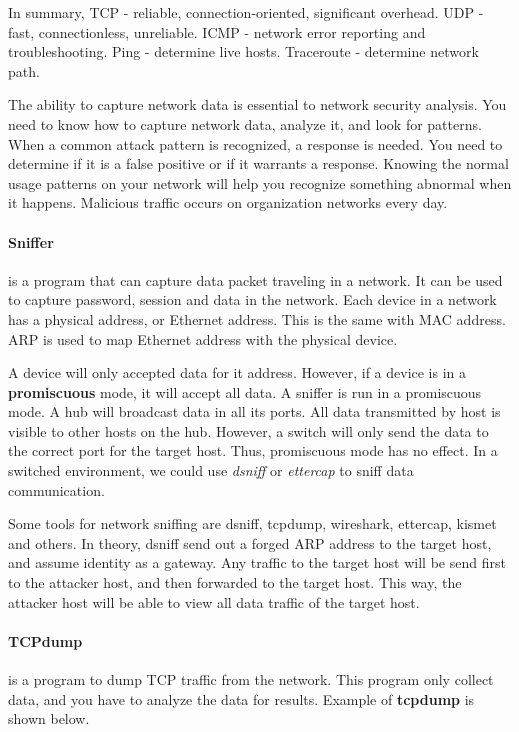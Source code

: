 \documentclass[7x9]{times}
\begin{document}
In summary, TCP - reliable, connection-oriented, significant
overhead. UDP - fast, connectionless, unreliable. ICMP -
network error reporting and troubleshooting. Ping -
determine live hosts. Traceroute - determine network path.

The ability to capture network data is essential to network
security analysis. You need to know how to capture network
data, analyze it, and look for patterns. When a common
attack pattern is recognized, a response is needed. You need
to determine if it is a false positive or if it warrants a
response. Knowing the normal usage patterns on your network
will help you recognize something abnormal when it happens.
Malicious traffic occurs on organization networks every day.

\paragraph{Sniffer} is a program that can capture data
packet traveling in a network. It can be used to capture
password, session and data in the network. Each device in a
network has a physical address, or Ethernet address. This is
the same with MAC address. ARP is used to map Ethernet
address with the physical device.

A device will only accepted data for it address. However, if
a device is in a \textbf{promiscuous} mode, it will accept
all data. A sniffer is run in a promiscuous mode. A hub will
broadcast data in all its ports. All data transmitted by
host is visible to other hosts on the hub. However, a switch
will only send the data to the correct port for the target
host. Thus, promiscuous mode has no effect. In a switched
environment, we could use \textit{dsniff} or
\textit{ettercap} to sniff data communication.

Some tools for network sniffing are dsniff, tcpdump,
wireshark, ettercap, kismet and others. In theory, dsniff
send out a forged ARP address to the target host, and assume
identity as a gateway. Any traffic to the target host will
be send first to the attacker host, and then forwarded to
the target host. This way, the attacker host will be able to
view all data traffic of the target host.

\paragraph{TCPdump} is a program to dump TCP traffic from
the network. This program only collect data, and you have to
analyze the data for results. Example of \textbf{tcpdump} 
is shown below.
\end{document}
